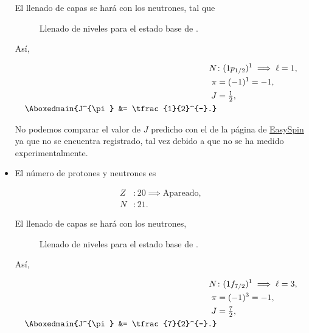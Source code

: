 \documentclass[./../main.tex]{subfiles}
\begin{document}
\begin{exercise}
\begin{itemize}
\begin{solution}
				El llenado de capas se hará con los neutrones, tal que

				\begin{figure}[htb]
                    \centering
                    
                    \caption{Llenado de niveles para el estado base de .}
                    \label{fig:FirstExcitedState15O}
                \end{figure}

				Así,

				\begin{align*}
					N &\colon (1p_{1/2})^{1} \implies \ell = 1,\\
					\pi &= (-1)^{1} = -1,\\
					J &= \tfrac{1}{2},\\
					\Aboxedmain{J^{\pi} &= \tfrac{1}{2}^{-}.}
				\end{align*}

				No podemos comparar el valor de \(J\) predicho con el de la página de \href{http://easyspin.org/documentation/isotopetable.html}{EasySpin} ya que no se encuentra registrado, tal vez debido a que no se ha medido experimentalmente.
			\end{solution} 
			
			\pagebreak
                \item {}
			
			\begin{solution}
				El número de protones y neutrones es

				\begin{align*}
					Z &\colon 20 \implies \text{Apareado},\\
					N &\colon 21.
				\end{align*}

				El llenado de capas se hará con los neutrones,

				\begin{figure}[htb]
                    \centering
                    
                    \caption{Llenado de niveles para el estado base de .}
                    \label{fig:FirstExcitedState41Ca}
                \end{figure}

				Así,

				\begin{align*}
					N &\colon (1f_{7/2})^{1} \implies \ell = 3,\\
					\pi &= (-1)^{3} = -1,\\
					J &= \tfrac{7}{2},\\
					\Aboxedmain{J^{\pi} &= \tfrac{7}{2}^{-}.}
				\end{align*}


\end{solution}
\end{itemize}
\end{exercise}
\end{document}
